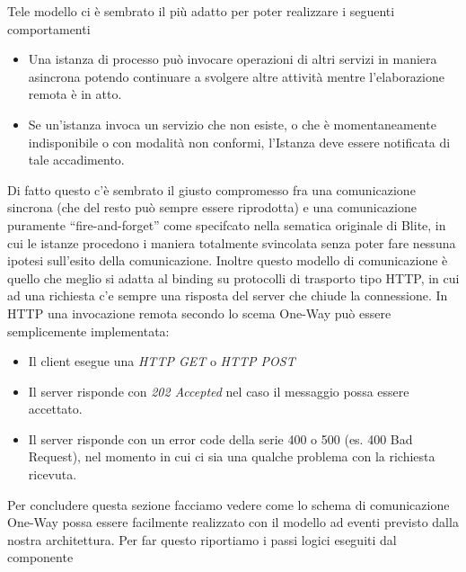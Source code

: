 Tele modello ci \`e sembrato il più adatto per poter realizzare i seguenti
comportamenti

\begin{itemize}
  \item Una istanza di processo può invocare operazioni di altri servizi in
  maniera asincrona potendo continuare a svolgere altre attività mentre
  l'elaborazione remota \`e in atto.
  
  \item Se un'istanza invoca un servizio che non esiste, o che \`e
  momentaneamente indisponibile o con modalità non conformi, l'Istanza deve essere notificata
  di tale accadimento.
\end{itemize}

Di fatto questo c'\`e sembrato il giusto compromesso fra una comunicazione
sincrona (che del resto può sempre essere riprodotta) e una comunicazione puramente
``fire-and-forget'' come specifcato nella sematica originale di Blite, in cui le
istanze procedono i maniera totalmente svincolata senza poter fare nessuna ipotesi sull'esito della comunicazione. Inoltre questo
modello di comunicazione \`e quello che meglio si adatta al binding su
protocolli di trasporto tipo HTTP, in cui ad una richiesta c'e sempre una
risposta del server che chiude la connessione. In HTTP una invocazione remota secondo lo scema
One-Way può essere semplicemente implementata:

\begin{itemize}
  \item Il client esegue una \emph{HTTP GET} o \emph{HTTP POST}
  \item Il server risponde con \emph{202 Accepted} nel caso il messaggio possa
  essere accettato.
  \item Il server risponde con un error code della serie 400 o 500 (es. 400 Bad
  Request), nel momento in cui ci sia una qualche problema con la richiesta
  ricevuta.
\end{itemize}


Per concludere questa sezione facciamo vedere come lo schema di comunicazione
One-Way possa essere facilmente realizzato con il modello ad eventi previsto
dalla nostra architettura. Per far questo riportiamo i passi logici eseguiti
dal componente 

